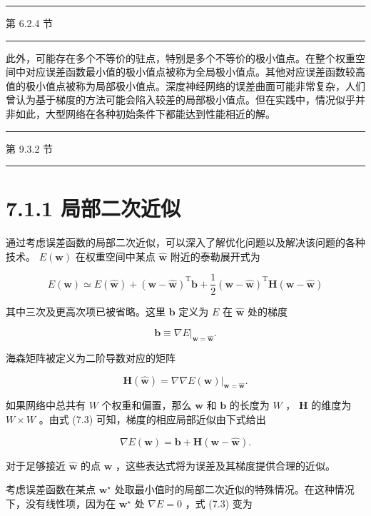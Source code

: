 \documentclass[10pt]{article}
\newcommand{\HRule}{\begin{center}\rule{0.9\linewidth}{0.2mm}\end{center}}
\begin{document}
\HRule

第 6.2.4 节

\HRule

此外，可能存在多个不等价的驻点，特别是多个不等价的极小值点。在整个权重空间中对应误差函数最小值的极小值点被称为全局极小值点。其他对应误差函数较高值的极小值点被称为局部极小值点。深度神经网络的误差曲面可能非常复杂，人们曾认为基于梯度的方法可能会陷入较差的局部极小值点。但在实践中，情况似乎并非如此，大型网络在各种初始条件下都能达到性能相近的解。

\HRule

第 9.3.2 节

\HRule

\section*{7.1.1 局部二次近似}

通过考虑误差函数的局部二次近似，可以深入了解优化问题以及解决该问题的各种技术。 \(E\left( \mathbf{w}\right)\) 在权重空间中某点 \(\widehat{\mathbf{w}}\) 附近的泰勒展开式为

\[
E\left( \mathbf{w}\right)  \simeq  E\left( \widehat{\mathbf{w}}\right)  + {\left( \mathbf{w} - \widehat{\mathbf{w}}\right) }^{\mathrm{T}}\mathbf{b} + \frac{1}{2}{\left( \mathbf{w} - \widehat{\mathbf{w}}\right) }^{\mathrm{T}}\mathbf{H}\left( {\mathbf{w} - \widehat{\mathbf{w}}}\right)  \tag{7.3}
\]

其中三次及更高次项已被省略。这里 \(\mathbf{b}\) 定义为 \(E\) 在 \(\widehat{\mathbf{w}}\) 处的梯度

\[
\mathbf{b} \equiv  {\left. \nabla E\right| }_{\mathbf{w} = \widehat{\mathbf{w}}}. \tag{7.4}
\]

海森矩阵被定义为二阶导数对应的矩阵

\[
\mathbf{H}\left( \widehat{\mathbf{w}}\right)  = {\left. \nabla \nabla E\left( \mathbf{w}\right) \right| }_{\mathbf{w} = \widehat{\mathbf{w}}}. \tag{7.5}
\]

如果网络中总共有 \(W\) 个权重和偏置，那么 \(\mathbf{w}\) 和 \(\mathbf{b}\) 的长度为 \(W\) ， \(\mathbf{H}\) 的维度为 \(W \times  W\) 。由式 (7.3) 可知，梯度的相应局部近似由下式给出

\[
\nabla E\left( \mathbf{w}\right)  = \mathbf{b} + \mathbf{H}\left( {\mathbf{w} - \widehat{\mathbf{w}}}\right) . \tag{7.6}
\]

对于足够接近 \(\widehat{\mathbf{w}}\) 的点 \(\mathbf{w}\) ，这些表达式将为误差及其梯度提供合理的近似。

考虑误差函数在某点 \({\mathbf{w}}^{ \star  }\) 处取最小值时的局部二次近似的特殊情况。在这种情况下，没有线性项，因为在 \({\mathbf{w}}^{ \star  }\) 处 \(\nabla E = 0\) ，式 (7.3) 变为
\end{document}
